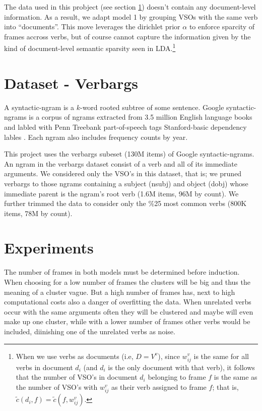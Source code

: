 \documentclass{article} %
\begin{document}
The data used in this probject (see section \ref{data}) doesn't contain any document-level
information. As a result, we adapt model 1 by grouping VSOs with the same verb into ``documents''.
This move leverages the dirichlet prior $\alpha$ to enforce sparcity of frames 
accross verbs, but of course cannot capture the information given by the kind of
document-level semantic sparsity seen in LDA.\footnote{When we use verbs as
documents (i.e, $D = V^v$), since $w_{ij}^v$ is the same for all verbs in document $d_i$ 
(and $d_i$ is the only document with that verb), it follows that the number of VSO's in document 
$d_i$ belonging to frame $f$ is the same as the number of VSO's with $w_{ij}^v$ as their verb assigned to 
frame $f$; that is, $\tilde c(d_i, f) = \tilde c(f, w_{ij}^v)$.}

\section{Dataset - Verbargs}
\label{data}

A syntactic-ngram is a $k$-word rooted subtree of some sentence.
Google syntactic-ngrams is a corpus of ngrams extracted from 3.5 million English language 
books and labled with Penn Treebank part-of-speech tags Stanford-basic dependency 
lables \citep{ngrams2013}.
Each ngram also includes frequency counts by year.

This project uses the verbargs subeset (130M items) of Google syntactic-ngrams.
An ngram in the verbargs dataset consist of a verb and all of its 
immediate arguments.
We considered only the VSO's in this dataset, that is; we pruned verbargs to
those ngrams containing a subject (nsubj) and object (dobj) whose immediate parent
is the ngram's root verb (1.6M items, 96M by count). 
We further trimmed the data to consider only the \%25 most common verbs 
(800K items, 78M by count).



\section{Experiments}
The number of frames in both models must be determined before induction. When choosing for a low number of frames the clusters will be big and thus the meaning of a cluster vague. But a high number of frames has, next to high computational costs also a danger of overfitting the data. When unrelated verbs occur with the same arguments often they will be clustered and maybe will even make up one cluster, while with a lower number of frames other verbs would be included, diinishing one of the unrelated verbs as noise.
\end{document}
